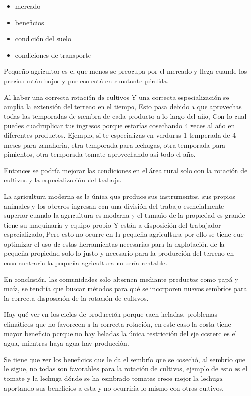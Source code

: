 \documentclass[
  letterpaper,
  DIV=11,
  numbers=noendperiod]{scrartcl}
\begin{document}
\begin{itemize}
\item
  mercado
\item
  beneficios
\item
  condición del suelo
\item
  condiciones de transporte
\end{itemize}

Pequeño agricultor es el que menos se preocupa por el mercado y llega
cuando los precios están bajos y por eso está en constante pérdida.

Al haber una correcta rotación de cultivos Y una correcta
especialización se amplía la extensión del terreno en el tiempo, Esto
pasa debido a que aprovechas todas las temporadas de siembra de cada
producto a lo largo del año, Con lo cual puedes cuadruplicar tus
ingresos porque estarías cosechando 4 veces al año en diferentes
productos. Ejemplo, si te especializas en verduras 1 temporada de 4
meses para zanahoria, otra temporada para lechugas, otra temporada para
pimientos, otra temporada tomate aprovechando así todo el año.

Entonces se podría mejorar las condiciones en el área rural solo con la
rotación de cultivos y la especialización del trabajo.

La agricultura moderna es la única que produce sus instrumentos, sus
propios animales y los obreros ingresan con una división del trabajo
esencialmente superior cuando la agricultura es moderna y el tamaño de
la propiedad es grande tiene su maquinaria y equipo propio Y están a
disposición del trabajador especializado, Pero esto no ocurre en la
pequeña agricultura por ello se tiene que optimizar el uso de estas
herramientas necesarias para la explotación de la pequeña propiedad solo
lo justo y necesario para la producción del terreno en caso contrario la
pequeña agricultura no sería rentable.

En conclusión, las comunidades solo alternan mediante productos como
papá y maíz, se tendría que buscar métodos para qué se incorporen nuevos
sembríos para la correcta disposición de la rotación de cultivos.

Hay qué ver en los ciclos de producción porque caen heladas, problemas
climáticos que no favorecen a la correcta rotación, en este caso la
costa tiene mayor beneficio porque no hay heladas la única restricción
del eje costero es el agua, mientras haya agua hay producción.

Se tiene que ver los beneficios que le da el sembrío que se cosechó, al
sembrío que le sigue, no todas son favorables para la rotación de
cultivos, ejemplo de esto es el tomate y la lechuga dónde se ha sembrado
tomates crece mejor la lechuga aportando sus beneficios a esta y no
ocurriría lo mismo con otros cultivos.
\end{document}
